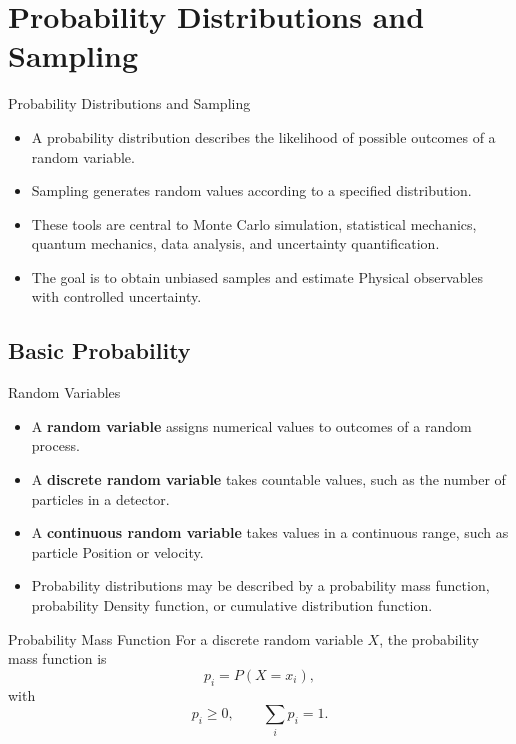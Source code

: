 \documentclass[a4paper, 10pt, onepage]{elegantbook}
\begin{document}
{\section{Probability Distributions and Sampling}

\begin{frame}{Probability Distributions and Sampling}
  \begin{itemize}
    \item A probability distribution describes the likelihood of possible outcomes of a random variable.
    \item Sampling generates random values according to a specified distribution.
    \item These tools are central to Monte Carlo simulation, statistical mechanics, quantum mechanics, data analysis, 
and uncertainty quantification.
    \item The goal is to obtain unbiased samples and estimate Physical observables with controlled uncertainty.
  \end{itemize}
\end{frame}

\subsection{Basic Probability}

\begin{frame}{Random Variables}
  \begin{itemize}
    \item A \textbf{random variable} assigns numerical values to outcomes of a random process.
    \item A \textbf{discrete random variable} takes countable values, such as the number of particles in a detector.
    \item A \textbf{continuous random variable} takes values in a continuous range, such as particle Position or 
velocity.
    \item Probability distributions may be described by a probability mass function, probability Density function, or 
cumulative distribution function.
  \end{itemize}
\end{frame}

\begin{frame}{Probability Mass Function}
  For a discrete random variable \(X\), the probability mass function is
  \[
    p_i = P(X=x_i),
  \]
  with
  \[
    p_i \ge 0,
    \qquad
    \sum_i p_i = 1.
  \]


\end{frame}}
\end{document}
